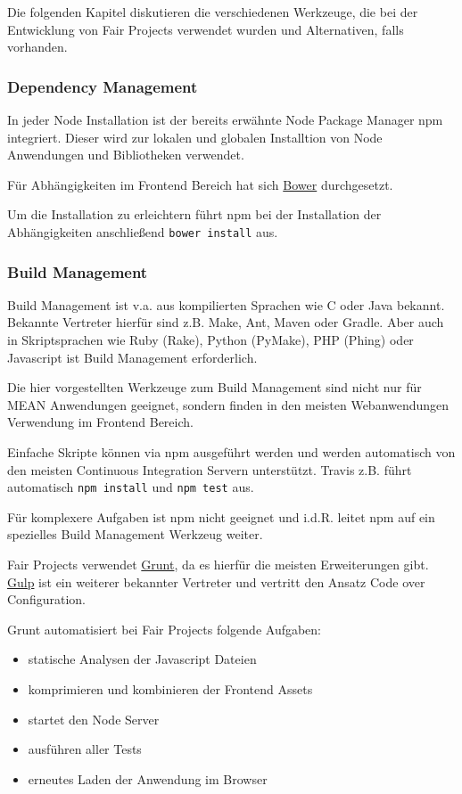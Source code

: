 Die folgenden Kapitel diskutieren die verschiedenen Werkzeuge, die bei
der Entwicklung von Fair Projects verwendet wurden und Alternativen,
falls vorhanden.

\subsubsection{Dependency Management}\label{dependency-management}

In jeder Node Installation ist der bereits erwähnte Node Package Manager
npm integriert. Dieser wird zur lokalen und globalen Installtion von
Node Anwendungen und Bibliotheken verwendet.

Für Abhängigkeiten im Frontend Bereich hat sich
\href{http://bower.io/}{Bower} durchgesetzt.

Um die Installation zu erleichtern führt npm bei der Installation der
Abhängigkeiten anschließend \texttt{bower\ install} aus.

\subsubsection{Build Management}\label{build-management}

Build Management ist v.a. aus kompilierten Sprachen wie C oder Java
bekannt. Bekannte Vertreter hierfür sind z.B. Make, Ant, Maven oder
Gradle. Aber auch in Skriptsprachen wie Ruby (Rake), Python (PyMake),
PHP (Phing) oder Javascript ist Build Management erforderlich.

Die hier vorgestellten Werkzeuge zum Build Management sind nicht nur für
MEAN Anwendungen geeignet, sondern finden in den meisten Webanwendungen
Verwendung im Frontend Bereich.

Einfache Skripte können via npm ausgeführt werden und werden automatisch
von den meisten Continuous Integration Servern unterstützt. Travis z.B.
führt automatisch \texttt{npm\ install} und \texttt{npm\ test} aus.

Für komplexere Aufgaben ist npm nicht geeignet und i.d.R. leitet npm auf
ein spezielles Build Management Werkzeug weiter.

Fair Projects verwendet \href{gruntjs.com}{Grunt}, da es hierfür die
meisten Erweiterungen gibt. \href{http://gulpjs.com/}{Gulp} ist ein
weiterer bekannter Vertreter und vertritt den Ansatz Code over
Configuration.

Grunt automatisiert bei Fair Projects folgende Aufgaben:

\begin{itemize}
\itemsep1pt\parskip0pt
\item
  statische Analysen der Javascript Dateien
\item
  komprimieren und kombinieren der Frontend Assets
\item
  startet den Node Server
\item
  ausführen aller Tests
\item
  erneutes Laden der Anwendung im Browser
\end{itemize}

